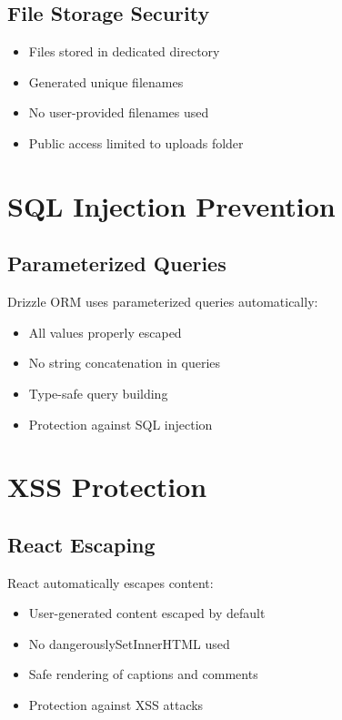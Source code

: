 \documentclass[12pt,a4paper]{report}
\begin{document}
\subsection{File Storage Security}

\begin{itemize}
    \item Files stored in dedicated directory
    \item Generated unique filenames
    \item No user-provided filenames used
    \item Public access limited to uploads folder
\end{itemize}

\section{SQL Injection Prevention}

\subsection{Parameterized Queries}

Drizzle ORM uses parameterized queries automatically:

\begin{itemize}
    \item All values properly escaped
    \item No string concatenation in queries
    \item Type-safe query building
    \item Protection against SQL injection
\end{itemize}

\section{XSS Protection}

\subsection{React Escaping}

React automatically escapes content:

\begin{itemize}
    \item User-generated content escaped by default
    \item No dangerouslySetInnerHTML used
    \item Safe rendering of captions and comments
    \item Protection against XSS attacks
\end{itemize}
\end{document}

